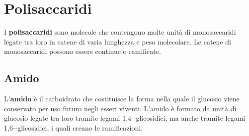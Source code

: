 \section{Polisaccaridi}\label{sec:polisaccaridi}
I \textbf{polisaccaridi} sono molecole che contengono molte unità di monosaccaridi legate tra loro in catene di varia lunghezza e peso molecolare. Le catene di monosaccaridi possono essere continue o ramificate.


\subsection{Amido}
L'\textbf{amido} è il carboidrato che costituisce la forma nella quale il glucosio viene conservato per uso futuro negli esseri viventi. L'amido è formato da unità di glucosio legate tra loro tramite legami 1,4-\a-glicosidici, ma anche tramite legami 1,6-\a-glicosidici, i quali creano le ramificazioni.

